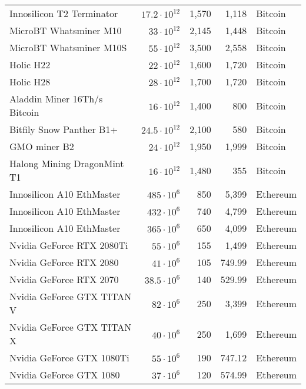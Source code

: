\begin{longtable}{|p{}|r|r|r|p{}|}
  Innosilicon T2 Terminator &    $17.2 \cdot 10^{12}$ & 1,570 & 1,118 & Bitcoin \\
  MicroBT Whatsminer M10 &       $33 \cdot 10^{12}$ & 2,145 & 1,448 & Bitcoin \\
  MicroBT Whatsminer M10S &      $55 \cdot 10^{12}$ & 3,500 & 2,558 & Bitcoin \\
  Holic H22 &                    $22 \cdot 10^{12}$ & 1,600 & 1,720 & Bitcoin \\
  Holic H28 &                    $28 \cdot 10^{12}$ & 1,700 & 1,720 & Bitcoin \\
  Aladdin Miner 16Th/s Bitcoin & $16 \cdot 10^{12}$ & 1,400 & 800 & Bitcoin \\
  Bitfily Snow Panther B1+ &     $24.5 \cdot 10^{12}$ & 2,100 & 580 & Bitcoin \\
  GMO miner B2 &                 $24 \cdot 10^{12}$ & 1,950 & 1,999 & Bitcoin \\
  Halong Mining DragonMint T1 &  $16 \cdot 10^{12}$ & 1,480 & 355 & Bitcoin \\
  \hline
  Innosilicon A10 EthMaster                                           & $485 \cdot 10^6$ & 850 & 5,399 & Ethereum \\
  Innosilicon A10 EthMaster                                           & $432 \cdot 10^6$ & 740 & 4,799 & Ethereum \\
  Innosilicon A10 EthMaster                                           & $365 \cdot 10^6$ & 650 & 4,099 & Ethereum \\
  Nvidia GeForce RTX 2080Ti                                           & $ 55 \cdot 10^6$ & 155 & 1,499 & Ethereum \\
  Nvidia GeForce RTX 2080                                             & $ 41 \cdot 10^6$ & 105 & 749.99 & Ethereum \\
  Nvidia GeForce RTX 2070                                             & $ 38.5 \cdot 10^6$ & 140 & 529.99 & Ethereum \\
  Nvidia GeForce GTX TITAN V                                          & $ 82 \cdot 10^6$ & 250 & 3,399 & Ethereum \\
  Nvidia GeForce GTX TITAN X                                          & $ 40 \cdot 10^6$ & 250 & 1,699 & Ethereum \\
  Nvidia GeForce GTX 1080Ti                                           & $ 55 \cdot 10^6$ & 190 & 747.12 & Ethereum \\
  Nvidia GeForce GTX 1080                                             & $ 37 \cdot 10^6$ & 120 & 574.99 & Ethereum \\

\end{longtable}
